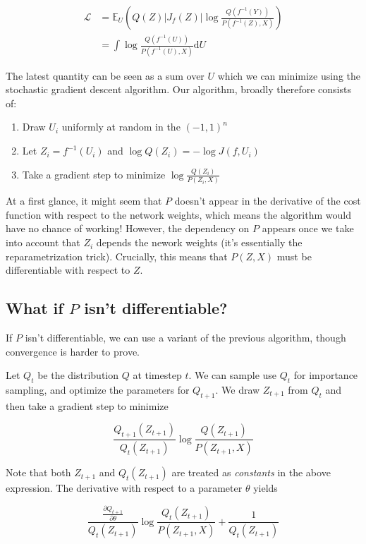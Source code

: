 \documentclass{article}
\begin{document}
\[
  \begin{aligned}
    \mathcal{L} &= \mathbb{E}_{U} \left(Q(Z)|J_{f}(Z)|\log \frac{Q(f^{-1}(Y))}{P(f^{-1}(Z),X)}\right)\\
                &= \int \log \frac{Q(f^{-1}(U))}{P(f^{-1}(U),X)} \mathrm{d}U
  \end{aligned}
\]

The latest quantity can be seen as a sum over $U$ which we can minimize using
the stochastic gradient descent algorithm. Our algorithm, broadly therefore
consists of:

\begin{enumerate}
\item Draw \(U_i\) uniformly at random in the \((-1,1)^n\)
\item Let \(Z_i = f^{-1}(U_i)\) and \(\log Q(Z_i) = -\log J(f, U_i)\)
\item Take a gradient step to minimize \(\log \frac{Q(Z_i)}{P(Z_i,X)}\)
\end{enumerate}

At a first glance, it might seem that \(P\) doesn't appear in the derivative
of the cost function with respect to the network weights, which means the
algorithm would have no chance of working! However, the dependency on
\(P\) appears once we take into account that \(Z_i\) depends the nework weights
(it's essentially the reparametrization trick). Crucially, this means that
\(P(Z,X)\) must be differentiable with respect to \(Z\).

\subsection{What if \(P\) isn't differentiable?}

If \(P\) isn't differentiable, we can use a variant of the previous algorithm,
though convergence is harder to prove.

Let \(Q_t\) be the distribution \(Q\) at timestep \(t\). We can sample use
\(Q_t\) for importance sampling, and optimize the parameters for \(Q_{t+1}\).
We draw \(Z_{t+1}\) from \(Q_t\) and then take a gradient step to minimize

\[
  \frac{Q_{t+1}(Z_{t+1})}{Q_t(Z_{t+1})} \log \frac{Q(Z_{t+1})}{P(Z_{t+1},X)}
\]

Note that both \(Z_{t+1}\) and \(Q_{t}(Z_{t+1})\) are treated as
\emph{constants} in the above expression. The derivative with respect
to a parameter \(\theta\) yields

\[
  \frac{\frac{\partial Q_{t+1}}{\partial \theta}}{Q_t(Z_{t+1})}\log \frac{Q_{t}(Z_{t+1})}{P(Z_{t+1},X)} + \frac{1}{Q_{t}(Z_{t+1})}
\]
\end{document}
